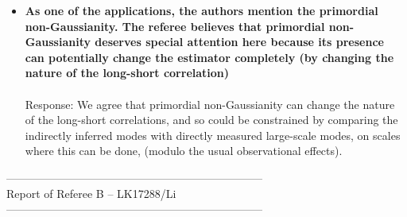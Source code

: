\documentclass{article}
\begin{document}
\begin{itemize}
\item \textbf{As one of the applications, the authors mention the primordial
non-Gaussianity. The referee believes that primordial non-Gaussianity
deserves special attention here because its presence can potentially
change the estimator completely (by changing the nature of the
long-short correlation)}\\ \\
Response:  We agree that primordial non-Gaussianity can change the nature of the long-short correlations, and so could be constrained by comparing the indirectly inferred modes with directly measured large-scale modes, on scales where this can be done, (modulo the usual observational effects).\\

\end{itemize} 
---------------------------------------------------------------------\\
Report of Referee B -- LK17288/Li\\
---------------------------------------------------------------------\\
\end{document}
